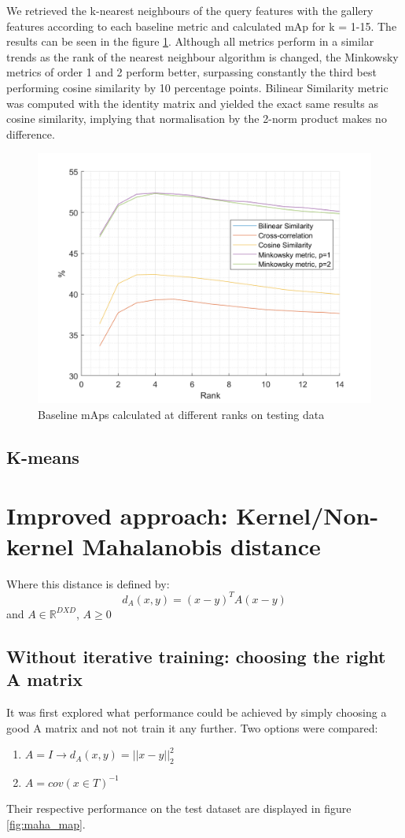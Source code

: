 \documentclass[10pt,technote]{IEEEtran}
\begin{document}
We retrieved the k-nearest neighbours of the query features with the gallery features according to each baseline metric and calculated mAp for k = 1-15. The results can be seen in the figure \ref{fig:baseline_map}. Although all metrics perform in a similar trends as the rank of the nearest neighbour algorithm is changed, the Minkowsky metrics of order 1 and 2 perform better, surpassing constantly the third best performing cosine similarity by 10 percentage points. Bilinear Similarity metric was computed with the identity matrix and yielded the exact same results as cosine similarity, implying that normalisation by the 2-norm product makes no difference.
\begin{figure}
    \centering
    \includegraphics[width=\linewidth]{Graphs/mAp_vs_rank_baseline.png}
    \caption{Baseline mAps calculated at different ranks on testing data}
    \label{fig:baseline_map}
\end{figure}
\subsection{K-means}

\section{Improved approach: Kernel/Non-kernel Mahalanobis distance}
Where this distance is defined by:
\begin{equation}
    d_A(x, y) = (x - y)^TA(x - y)
\end{equation}
and $A \in \mathbb{R}^{DXD}$, $A \ge 0$
\subsection{Without iterative training: choosing the right A matrix}
It was first explored what performance could be achieved by simply choosing a good A matrix and not not train it any further. Two options were compared:
\begin{enumerate}
    \item $A = I \rightarrow d_A(x, y) = ||x - y||_2^2$
    \item $A = cov(x \in T)^{-1}$
\end{enumerate}
Their respective performance on the test dataset are displayed in figure \ref{fig:maha_map}. 
\end{document}
